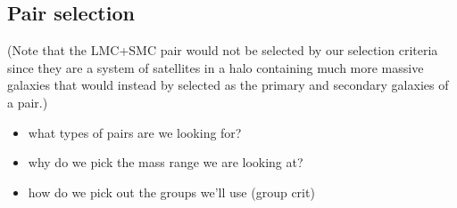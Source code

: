 \documentclass[twocolumn]{aastex631}
\begin{document}
\subsection{Pair selection}\label{sec:methods-pairs}
(Note that the LMC+SMC pair would not be selected by our selection criteria since they are a system of satellites in a halo containing much more massive galaxies that would instead by selected as the primary and secondary galaxies of a pair.)


    \begin{itemize}
        \item what types of pairs are we looking for? 
        \item why do we pick the mass range we are looking at?
        \item how do we pick out the groups we'll use (group crit)
    \end{itemize}
\end{document}
